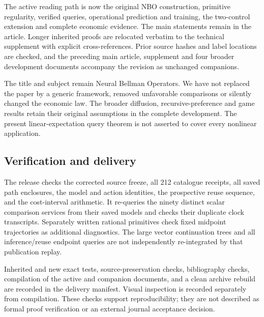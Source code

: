 The active reading path is now the original NBO construction, primitive
regularity, verified queries, operational prediction and training, the
two-control extension and complete economic evidence. The main
statements remain in the article. Longer inherited proofs are relocated
verbatim to the technical supplement with explicit cross-references.
Prior source hashes and label locations are checked, and the preceding
main article, supplement and four broader development documents
accompany the revision as unchanged companions.

The title and subject remain Neural Bellman Operators. We have not
replaced the paper by a generic framework, removed unfavorable
comparisons or silently changed the economic law. The broader diffusion,
recursive-preference and game results retain their original assumptions
in the complete development. The present linear-expectation query
theorem is not asserted to cover every nonlinear application.

\hypertarget{verification-and-delivery}{%
\subsection{Verification and delivery}\label{verification-and-delivery}}

The release checks the corrected source freeze, all 212 catalogue
receipts, all saved path enclosures, the model and action identities,
the prospective reuse sequence, and the cost-interval arithmetic. It
re-queries the ninety distinct scalar comparison services from their
saved models and checks their duplicate clock transcripts. Separately
written rational primitives check fixed midpoint trajectories as
additional diagnostics. The large vector continuation trees and all
inference/reuse endpoint queries are not independently re-integrated by
that publication replay.

Inherited and new exact tests, source-preservation checks, bibliography
checks, compilation of the active and companion documents, and a clean
archive rebuild are recorded in the delivery manifest. Visual inspection
is recorded separately from compilation. These checks support
reproducibility; they are not described as formal proof verification or
an external journal acceptance decision.
